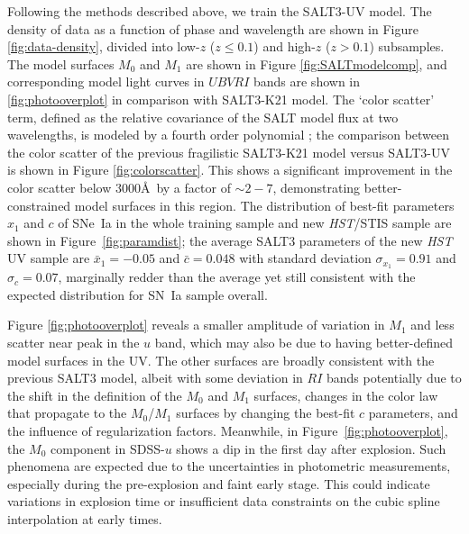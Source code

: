 \documentclass[twocolumn,tighten,times,floatfix]{aastex631}
\begin{document}
Following the methods described above, we train the SALT3-UV model. The density of data as a function of phase and wavelength are shown in Figure \ref{fig:data-density}, divided into low-$z$ ($z\leq0.1$) and high-$z$ ($z>0.1$) subsamples. The model surfaces $M_0$ and $M_1$ are shown in Figure \ref{fig:SALTmodelcomp}, and corresponding model light curves in $UBVRI$ bands are shown in \ref{fig:photooverplot} in comparison with SALT3-K21 model. 
The `color scatter' term, defined as the relative covariance of the SALT model flux at two wavelengths, is modeled by a fourth order polynomial \citep{Guy10, kenworthy_salt3_2021};
the comparison between the color scatter of the previous fragilistic SALT3-K21 model versus SALT3-UV is shown in Figure \ref{fig:colorscatter}.  This shows a significant improvement in the color scatter below $3000$\AA\ by a factor of $\sim 2-7$, demonstrating better-constrained model surfaces in this region.
The distribution of best-fit parameters $x_1$ and $c$ of SNe~Ia in the whole training sample and new \textit{HST}/STIS sample are shown in Figure~\ref{fig:paramdist};
the average SALT3 parameters of the new \textit{HST} UV sample are $\bar x_1 = -0.05$ and $\bar c = 0.048$ with standard deviation $\sigma_{x_1} = 0.91$ and $\sigma_{c} = 0.07$, marginally redder than the average yet still consistent with the expected distribution for SN~Ia sample overall. 

Figure \ref{fig:photooverplot} reveals a smaller amplitude of variation in $M_1$ and less scatter near peak in the $u$ band, which may also be due to having better-defined model surfaces in the UV.  The other surfaces are broadly consistent with the previous SALT3 model, albeit with some deviation in $RI$ bands potentially due to the shift in the definition of the $M_0$ and $M_1$ surfaces, changes in the color law that propagate to the $M_0$/$M_1$ surfaces by changing the best-fit $c$ parameters, and the influence of regularization factors. 
Meanwhile, in Figure~\ref{fig:photooverplot}, the $M_0$ component in SDSS-$u$ shows a dip in the first day after explosion. Such phenomena are expected due to the uncertainties in photometric measurements, especially during the pre-explosion and faint early stage.  This could indicate variations in explosion time or insufficient data constraints on the cubic spline interpolation at early times.
\end{document}
